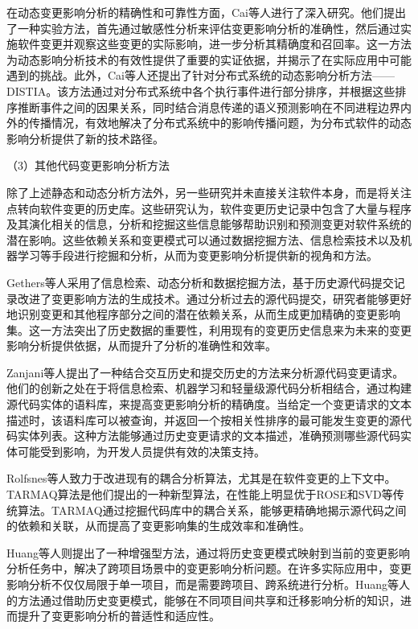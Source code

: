 在动态变更影响分析的精确性和可靠性方面，Cai等人\cite{2015Acom,2014Estimating}进行了深入研究。他们提出了一种实验方法，首先通过敏感性分析来评估变更影响分析的准确性，然后通过实施软件变更并观察这些变更的实际影响，进一步分析其精确度和召回率。这一方法为动态影响分析技术的有效性提供了重要的实证依据，并揭示了在实际应用中可能遇到的挑战。此外，Cai等人还提出了针对分布式系统的动态影响分析方法——DISTIA\cite{2016DistIA}。该方法通过对分布式系统中各个执行事件进行部分排序，并根据这些排序推断事件之间的因果关系，同时结合消息传递的语义预测影响在不同进程边界内外的传播情况，有效地解决了分布式系统中的影响传播问题，为分布式软件的动态影响分析提供了新的技术路径。

（3）其他代码变更影响分析方法

除了上述静态和动态分析方法外，另一些研究并未直接关注软件本身，而是将关注点转向软件变更的历史库\cite{2011An, Markus2017Supporting, 2008Mining, 2014Impact, 2016Generalizing}。这些研究认为，软件变更历史记录中包含了大量与程序及其演化相关的信息，分析和挖掘这些信息能够帮助识别和预测变更对软件系统的潜在影响。这些依赖关系和变更模式可以通过数据挖掘方法、信息检索技术以及机器学习等手段进行挖掘和分析，从而为变更影响分析提供新的视角和方法。

Gethers等人\cite{2011An}采用了信息检索、动态分析和数据挖掘方法，基于历史源代码提交记录改进了变更影响方法的生成技术。通过分析过去的源代码提交，研究者能够更好地识别变更和其他程序部分之间的潜在依赖关系，从而生成更加精确的变更影响集。这一方法突出了历史数据的重要性，利用现有的变更历史信息来为未来的变更影响分析提供依据，从而提升了分析的准确性和效率。

Zanjani等人\cite{2014Impact}提出了一种结合交互历史和提交历史的方法来分析源代码变更请求。他们的创新之处在于将信息检索、机器学习和轻量级源代码分析相结合，通过构建源代码实体的语料库，来提高变更影响分析的精确度。当给定一个变更请求的文本描述时，该语料库可以被查询，并返回一个按相关性排序的最可能发生变更的源代码实体列表。这种方法能够通过历史变更请求的文本描述，准确预测哪些源代码实体可能受到影响，为开发人员提供有效的决策支持。

Rolfsnes等人\cite{2016Generalizing}致力于改进现有的耦合分析算法，尤其是在软件变更的上下文中。TARMAQ算法是他们提出的一种新型算法，在性能上明显优于ROSE\cite{2005Mining}和SVD等传统算法。TARMAQ通过挖掘代码库中的耦合关系，能够更精确地揭示源代码之间的依赖和关联，从而提高了变更影响集的生成效率和准确性。

Huang等人\cite{2021Change}则提出了一种增强型方法，通过将历史变更模式映射到当前的变更影响分析任务中，解决了跨项目场景中的变更影响分析问题。在许多实际应用中，变更影响分析不仅仅局限于单一项目，而是需要跨项目、跨系统进行分析。Huang等人的方法通过借助历史变更模式，能够在不同项目间共享和迁移影响分析的知识，进而提升了变更影响分析的普适性和适应性。


